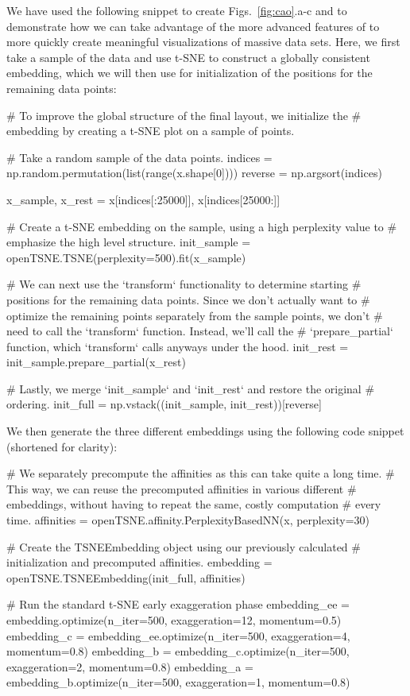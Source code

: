 \documentclass[article]{jss}
\newcommand{\opentsne}{\pkg{openTSNE}\xspace}
\begin{document}
We have used the following snippet to create Figs.~\ref{fig:cao}.a-c and to demonstrate how we can take advantage of the more advanced features of \opentsne to more quickly create meaningful visualizations of massive data sets. Here, we first take a sample of the data and use t-SNE to construct a globally consistent embedding, which we will then use for initialization of the positions for the remaining data points:
\begin{CodeChunk}
\begin{CodeInput}
# To improve the global structure of the final layout, we initialize the
# embedding by creating a t-SNE plot on a sample of points.

# Take a random sample of the data points.
indices = np.random.permutation(list(range(x.shape[0])))
reverse = np.argsort(indices)

x_sample, x_rest = x[indices[:25000]], x[indices[25000:]]

# Create a t-SNE embedding on the sample, using a high perplexity value to
# emphasize the high level structure.
init_sample = openTSNE.TSNE(perplexity=500).fit(x_sample)

# We can next use the `transform` functionality to determine starting
# positions for the remaining data points. Since we don't actually want to
# optimize the remaining points separately from the sample points, we don't
# need to call the `transform` function. Instead, we'll call the
# `prepare_partial` function, which `transform` calls anyways under the hood.
init_rest = init_sample.prepare_partial(x_rest)

# Lastly, we merge `init_sample` and `init_rest` and restore the original
# ordering.
init_full = np.vstack((init_sample, init_rest))[reverse]
\end{CodeInput}
\end{CodeChunk}
We then generate the three different embeddings using the following code snippet (shortened for clarity):
\begin{CodeChunk}
\begin{CodeInput}
# We separately precompute the affinities as this can take quite a long time.
# This way, we can reuse the precomputed affinities in various different
# embeddings, without having to repeat the same, costly computation
# every time.
affinities = openTSNE.affinity.PerplexityBasedNN(x, perplexity=30)

# Create the TSNEEmbedding object using our previously calculated
# initialization and precomputed affinities.
embedding = openTSNE.TSNEEmbedding(init_full, affinities)

# Run the standard t-SNE early exaggeration phase
embedding_ee = embedding.optimize(n_iter=500, exaggeration=12, momentum=0.5)
embedding_c = embedding_ee.optimize(n_iter=500, exaggeration=4, momentum=0.8)
embedding_b = embedding_c.optimize(n_iter=500, exaggeration=2, momentum=0.8)
embedding_a = embedding_b.optimize(n_iter=500, exaggeration=1, momentum=0.8)
\end{CodeInput}
\end{CodeChunk}
\end{document}
